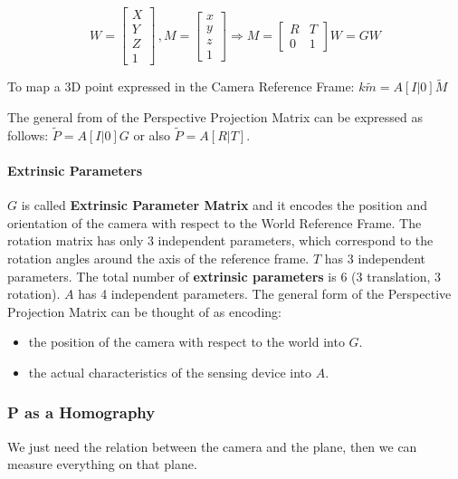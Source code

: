 \documentclass{article}
\begin{document}
$$
W =
\begin{bmatrix}
X \\ Y \\ Z \\ 1
\end{bmatrix}
\,,
M=
\begin{bmatrix}
x\\ y\\ z\\1
\end{bmatrix}
\Rightarrow
M=
\begin{bmatrix}
R & T \\
0 & 1
\end{bmatrix}
W = GW
$$

To map a 3D point expressed in the Camera Reference Frame: $k\tilde{m} = A[I|0]\tilde{M}$

The general from of the Perspective Projection Matrix can be expressed as follows:
$\tilde{P} = A[I|0]G$ or also $\tilde{P}=A[R|T]$.

\paragraph{Extrinsic Parameters}

$G$ is called \textbf{Extrinsic Parameter Matrix} and it encodes the position and orientation of the camera with respect to the World Reference Frame.
The rotation matrix has only 3 independent parameters, which correspond to the rotation angles around the axis of the reference frame.
$T$ has 3 independent parameters.
The total number of \textbf{extrinsic parameters} is 6 (3 translation, 3 rotation).
$A$ has 4 independent parameters.
The general form of the Perspective Projection Matrix can be thought of as encoding:
\begin{itemize}
  \item the position of the camera with respect to the world into $G$.
  \item the actual characteristics of the sensing device into $A$.
\end{itemize}

\subsubsection{P as a Homography}
We just need the relation between the camera and the plane, then we can measure everything on that plane.
\end{document}
